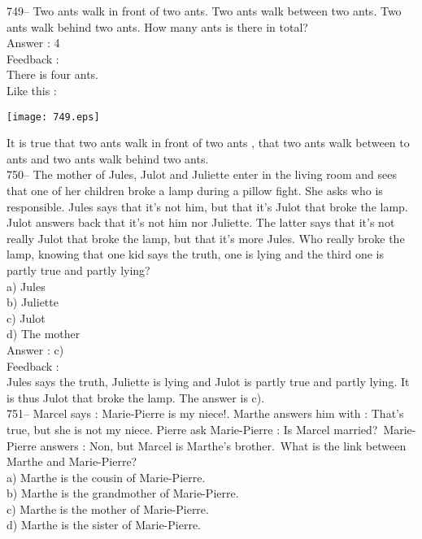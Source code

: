 \documentclass[letterpaper, 12pt]{article}
\begin{document}
749-- Two ants walk in front of two ants. Two ants walk between two ants. Two ants walk behind two ants. How many ants is there in total?\\


Answer : 4\\

Feedback :\\
There is four ants.\\
Like this :\\
\begin{center}
\texttt{[image: 749.eps]}
\end{center}

It is true that two ants walk in front of two ants , that two ants walk between to ants and two ants walk behind two ants.\\

750-- The mother of Jules, Julot and Juliette enter in the living room and sees that one of her children broke a lamp during a pillow fight. She asks who is responsible. Jules says that it's not him, but that it's Julot that broke the lamp. Julot answers back that it's not him nor Juliette. The latter says that it's not really Julot that broke the lamp, but that it's more Jules. Who really broke the lamp, knowing that one kid says the truth, one is lying and the third one is partly true and partly lying?\\
a) Jules\\
b) Juliette\\
c) Julot\\
d) The mother\\

Answer : c)\\

Feedback : \\
Jules says the truth, Juliette is lying and Julot is partly true and partly lying. It is thus Julot that broke the lamp. The answer is c).\\

751-- Marcel says : \og Marie-Pierre is my niece!\fg .  Marthe
answers him with : \og That's true, but she is not my niece\fg .
Pierre ask Marie-Pierre : \og Is Marcel married?\fg\ Marie-Pierre answers : \og Non, but Marcel is Marthe's brother.\fg\  
What is the link between Marthe and Marie-Pierre?\\
a) Marthe is the cousin of Marie-Pierre.\\
b) Marthe is the grandmother of Marie-Pierre.\\
c) Marthe is the mother of Marie-Pierre.\\
d) Marthe is the sister of Marie-Pierre.\\
\end{document}
